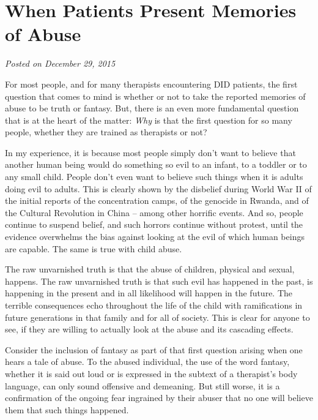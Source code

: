 \documentclass[]{book}
\begin{document}
\hypertarget{when-patients-present-memories-of-abuse}{%
\section{When Patients Present Memories of Abuse}\label{when-patients-present-memories-of-abuse}}

\emph{Posted on December 29, 2015}

For most people, and for many therapists encountering DID patients, the first question that comes to mind is whether or not to take the reported memories of abuse to be truth or fantasy. But, there is an even more fundamental question that is at the heart of the matter: \emph{Why} is that the first question for so many people, whether they are trained as therapists or not?

In my experience, it is because most people simply don't want to believe that another human being would do something so evil to an infant, to a toddler or to any small child. People don't even want to believe such things when it is adults doing evil to adults. This is clearly shown by the disbelief during World War II of the initial reports of the concentration camps, of the genocide in Rwanda, and of the Cultural Revolution in China -- among other horrific events. And so, people continue to suspend belief, and such horrors continue without protest, until the evidence overwhelms the bias against looking at the evil of which human beings are capable. The same is true with child abuse.

The raw unvarnished truth is that the abuse of children, physical and sexual, happens. The raw unvarnished truth is that such evil has happened in the past, is happening in the present and in all likelihood will happen in the future. The terrible consequences echo throughout the life of the child with ramifications in future generations in that family and for all of society. This is clear for anyone to see, if they are willing to actually look at the abuse and its cascading effects.

Consider the inclusion of fantasy as part of that first question arising when one hears a tale of abuse. To the abused individual, the use of the word fantasy, whether it is said out loud or is expressed in the subtext of a therapist's body language, can only sound offensive and demeaning. But still worse, it is a confirmation of the ongoing fear ingrained by their abuser that no one will believe them that such things happened.
\end{document}
